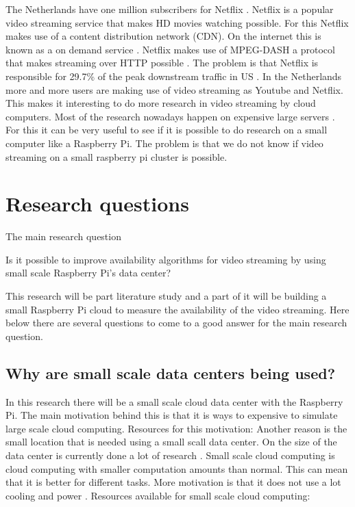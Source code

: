 \documentclass{sig-alternate-br}
\begin{document}
The Netherlands have one million subscribers for Netflix \cite{volkskrant}. Netflix is a popular video streaming service that makes HD movies watching possible. For this Netflix makes use of a content distribution network (CDN). On the internet this is known as a on demand service \cite{Adhikari:2012}. Netflix makes use of MPEG-DASH a protocol that makes streaming over HTTP possible \cite{martin:2013}. The problem is that Netflix is responsible for  29.7\% of the peak downstream traffic in US \cite{Adhikari:2012}. \newline
In the Netherlands more and more users are making use of video streaming as Youtube and Netflix. This makes it interesting to do more research in video streaming by cloud computers. Most of the research nowadays happen on expensive large servers \cite{tso:2013}. For this it can be very useful to see if it is possible to do research on a small computer like a Raspberry Pi. The problem is that we do not know if video streaming on a small raspberry pi cluster is possible. 

\section{Research questions}
The main research question
\begin{center} 
Is it possible to improve availability algorithms for video streaming by using small scale Raspberry Pi’s data center? \end{center}
This research will be part literature study and a part of it will be building a small Raspberry Pi cloud to measure the availability of the video streaming. Here below there are several questions to come to a good answer for the main research question. 
\newline \newline
\subsection{Why are small scale data centers being used?}
In this research there will be a small scale cloud data center with the Raspberry Pi. The main motivation behind this is that it is ways to expensive to simulate large scale cloud computing. Resources for this motivation:
\cite{southampton, Powerusage, cox:2014} \newline
Another reason is the small location that is needed using a small scall data center. On the size of the data center is currently done a lot of research \cite{Pcextreme}. \newline
Small scale cloud computing is cloud computing with smaller computation amounts than normal. This can mean that it is better for different tasks. More motivation is that it does not use a lot cooling and power \cite{tso:2013}. Resources available for small scale cloud computing:
\cite{Pcextreme,armbrust:2009,richardson:2012,abrahamsson:2013,southampton, tso:2013, beloglazov:2010, qian:2009, hofer:2011, drago2012inside, dropbox, owncloud, Miettinen:2010:EEM:1863103.1863107, beloglazov2012energy,cox:2014} 
 
\end{document}
